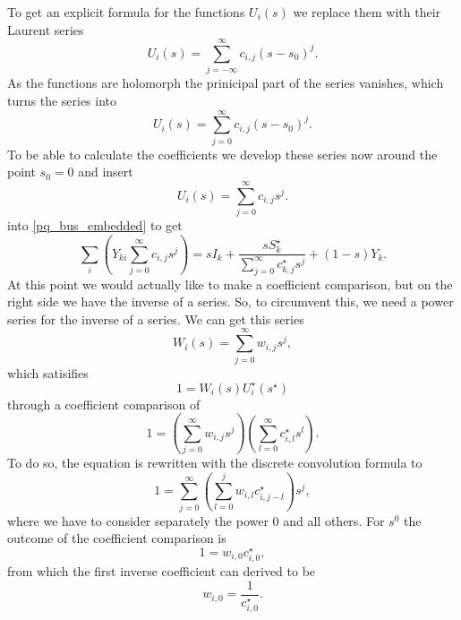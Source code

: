 To get an explicit formula for the functions $U_i(s)$ we replace them with their Laurent series
\begin{equation}
	U_i(s) = \sum_{j = -\infty}^\infty c_{i,j} (s - s_0)^j.
\end{equation}
As the functions are holomorph the prinicipal part of the series vanishes, which turns the series into
\begin{equation}
	U_i(s) = \sum_{j = 0}^\infty c_{i,j} (s - s_0)^j.
\end{equation}
To be able to calculate the coefficients we develop these series now around the point $s_0 = 0$ and insert
\begin{equation}
	U_i(s) = \sum_{j = 0}^\infty c_{i,j} s^j.
	\label{eq:helm_series}
\end{equation}
 into \eqref{pq_bus_embedded} to get
\begin{equation}
		\sum_i \left( Y_{ki} \sum_{j = 0}^\infty c_{i,j} s^j \right) = s I_k + \frac{s S_k^\star}{\sum_{j = 0}^\infty c_{k,j}^\star s^j} + (1 - s) Y_k.
		\label{eq:helm_series_pq_bus}
\end{equation}
At this point we would actually like to make a coefficient comparison, but on the right side we have the inverse of a series. So, to circumvent this, we need a power series for the inverse of a series. We can get this series
\begin{equation}
	W_i(s) = \sum_{j = 0}^\infty w_{i,j} s^j,
\end{equation}
which satisifies
\begin{equation}
	1 = W_i(s) U_i^\star(s^\star)
\end{equation}
through a coefficient comparison of
\begin{equation}
	1 = \left( \sum_{j = 0}^\infty w_{i,j} s^j \right) \left( \sum_{l = 0}^\infty c_{i,l}^\star s^l \right).
\end{equation}
To do so, the equation is rewritten with the discrete convolution formula to
\begin{equation}
	1 = \sum_{j = 0}^\infty \left( \sum_{l = 0}^j w_{i,l} c_{i,j - l}^\star \right) s^j,
\end{equation}
where we have to consider separately the power 0 and all others. For $s^0$ the outcome of the coefficient comparison is
\begin{equation}
	1 = w_{i,0} c_{i,0}^\star,
\end{equation}
from which the first inverse coefficient can derived to be
\begin{equation}
	w_{i,0} = \frac{1}{c_{i,0}^\star}.
\end{equation}
